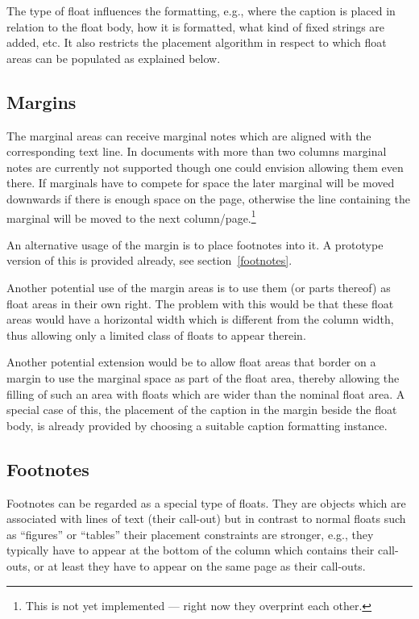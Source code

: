 \documentclass[twocolumn]{article}
\begin{document}
The type of float influences the formatting, e.g., where the caption
is placed in relation to the float body, how it is formatted, what
kind of fixed strings are added, etc. It also restricts the placement
algorithm in respect to which float areas can be populated as
explained below.

\subsection{Margins}

The marginal areas can receive marginal notes which are aligned with
the corresponding text line. In documents with more than two columns
marginal notes are currently not supported though one could envision
allowing them even there. If marginals have to compete for space the
later marginal will be moved downwards if there is enough space on the
page, otherwise the line containing the marginal will be moved to the
next column/\allowbreak page.\footnote{This is not yet implemented ---
right now they overprint each other.}

An alternative usage of the margin is to place footnotes into it. A
prototype version of this is provided already, see
section~\vref{footnotes}.

Another potential use of the margin areas is to use them (or parts
thereof) as float areas in their own right. The problem with this
would be that these float areas would have a horizontal width which is
different from the column width, thus allowing only a limited class of
floats to appear therein.

Another potential extension would be to allow float areas that border
on a margin to use the marginal space as part of the float area,
thereby allowing the filling of such an area with floats which are
wider than the nominal float area. A special case of this, the
placement of the caption in the margin beside the float body, is
already provided by choosing a suitable caption formatting instance.




\subsection{Footnotes}\label{footnotes}


Footnotes can be regarded as a special type of floats. They are objects
which are associated with lines of text (their call-out) but in
contrast to normal floats such as ``figures'' or ``tables'' their placement
constraints are stronger, e.g., they typically have to appear at the
bottom of the column which contains their call-outs, or at least they
have to appear on the same page as their call-outs.
\end{document}
